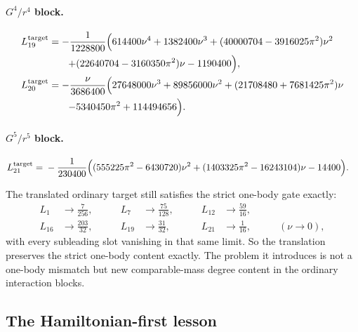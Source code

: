 \documentclass[11pt]{article}
\begin{document}
\paragraph{\texorpdfstring{$G^4/r^4$}{G	extasciicircum4/r	extasciicircum4} block.}
\begin{align}
L_{19}^{\rm target}
&=
-\frac{1}{1228800}\Bigl(
614400\nu^4+1382400\nu^3
+(40000704-3916025\pi^2)\nu^2
\Bigr.
\nonumber\\
&\hspace{2em}\Bigl.
+(22640704-3160350\pi^2)\nu-1190400
\Bigr),
\label{eq:app-local-target-ordinary-L19}
\\
L_{20}^{\rm target}
&=
-\frac{\nu}{3686400}\Bigl(
27648000\nu^3+89856000\nu^2
+(21708480+7681425\pi^2)\nu
\Bigr.
\nonumber\\
&\hspace{2em}\Bigl.
-5340450\pi^2+114494656
\Bigr).
\label{eq:app-local-target-ordinary-L20}
\end{align}

\paragraph{\texorpdfstring{$G^5/r^5$}{G	extasciicircum5/r	extasciicircum5} block.}
\begin{equation}
\begin{aligned}
L_{21}^{\rm target}
={}&
-\frac{1}{230400}\Bigl(
(555225\pi^2-6430720)\nu^2
+(1403325\pi^2-16243104)\nu
-14400
\Bigr).
\end{aligned}
\label{eq:app-local-target-ordinary-L21}
\end{equation}

The translated ordinary target still satisfies the strict one-body gate exactly:
\begin{equation}
\begin{aligned}
L_1&\to\frac{7}{256},
&\qquad
L_7&\to\frac{75}{128},
&\qquad
L_{12}&\to\frac{59}{16},
\\
L_{16}&\to\frac{203}{32},
&\qquad
L_{19}&\to\frac{31}{32},
&\qquad
L_{21}&\to\frac{1}{16},
&\qquad
(\nu\to0),
\end{aligned}
\label{eq:app-local-target-ordinary-onebody-gate}
\end{equation}
with every subleading slot vanishing in that same limit.  So the translation
preserves the strict one-body content exactly.  The problem it introduces is not
a one-body mismatch but new comparable-mass degree content in the ordinary
interaction blocks.

\subsection{The Hamiltonian-first lesson}
\label{app:imported-local-target-hamiltonian-first-lesson}
\end{document}
